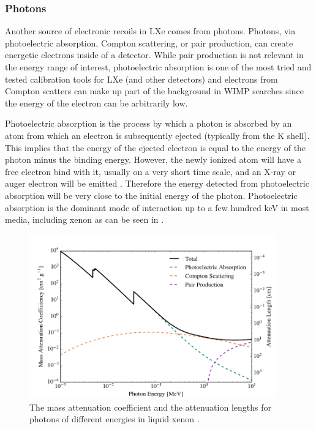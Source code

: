 \subsubsection{Photons}

Another source of electronic recoils in LXe comes from photons.  Photons, via photoelectric absorption, Compton scattering, or pair production, can create energetic electrons inside of a detector.  While pair production is not relevant in the energy range of interest, photoelectric absorption is one of the most tried and tested calibration tools for LXe (and other detectors) and electrons from Compton scatters can make up part of the background in WIMP searches since the energy of the electron can be arbitrarily low.

Photoelectric absorption is the process by which a photon is absorbed by an atom from which an electron is subsequently ejected (typically from the K shell).  This implies that the energy of the ejected electron is equal to the energy of the photon minus the binding energy.  However, the newly ionized atom will have a free electron bind with it, usually on a very short time scale, and an X-ray or auger electron will be emitted \cite{knoll2010radiation}.  Therefore the energy detected from photoelectric absorption will be very close to the initial energy of the photon.  Photoelectric absorption is the dominant mode of interaction up to a few hundred keV in most media, including xenon as can be seen in .  

\begin{figure}[t]
	\centering
	\includegraphics[width=0.95\textwidth]{photon_attenuation}
	\caption{The mass attenuation coefficient and the attenuation lengths for photons of different energies in liquid xenon \cite{berger8coll}.}
	\label{fig:photon_attenuation}
\end{figure}

